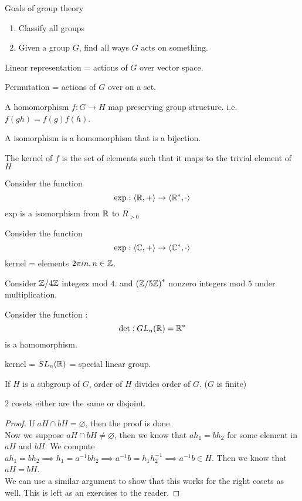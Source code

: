 \begin{remark}
	Goals of group theory
	\begin{enumerate}
		\item Classify all groups
		\item Given a group $G$, find all ways $G$ acts on something.
	\end{enumerate}
\end{remark}
\begin{example}
	Linear representation = actions of $G$ over vector space.

	Permutation = actions of $G$ over on a set.
\end{example}
\begin{definition}
	A homomorphism $f: G \to H$ map preserving group structure. i.e. $f(gh) = f(g)f(h)$.

	A isomorphism is a homomorphism that is a bijection. 

	The kernel of $f$ is the set of elements such that it maps to the trivial element of $H$ 
\end{definition}
\begin{example}
	Consider the function
	\[ \mathrm{exp} : \langle \mathbb R, + \rangle \to \langle \mathbb R^*, \cdot \rangle\]
	exp is a isomorphism from $\mathbb R$ to $R_{> 0}$
\end{example}
\begin{example}
	Consider the function
	\[ \mathrm{exp} : \langle \mathbb C, + \rangle \to \langle \mathbb C^*, \cdot \rangle\]
	kernel = elements $2\pi i n, n \in \mathbb Z$.
\end{example}
\begin{example}
	Consider $\mathbb Z/4 \mathbb Z$ integers mod $4$. and $\left( \mathbb Z/ 5 \mathbb Z \right)^*$ nonzero integers mod $5$ under multiplication.
\end{example}
\begin{example}
	Consider the function :
	\[ \mathrm{det} : GL_n(\mathbb R) = \mathbb R^*\]
	is a homomorphism.

	kernel = $SL_n(\mathbb R)$ = special linear group.
\end{example}
\begin{theorem}
	If $H$ is a subgroup of $G$, order of $H$ divides order of $G$. ($G$ is finite)
\end{theorem}
\begin{lemma}
	2 cosets either are the same or disjoint.
\end{lemma}
\begin{proof}
    If $aH \cap bH = \varnothing$, then the proof is done. \\
    Now we suppose $aH \cap bH \neq \varnothing$, then we know that $ah_1 = bh_2$ for some element in $aH$ and $bH$. We compute $ah_1 = bh_2 \implies h_1 = a^{-1}bh_2 \implies a^{-1}b = h_1h_2^{-1} \implies a^{-1}b \in H$. Then we know that $aH = bH$. \\
    We can use a similar argument to show that this works for the right cosets as well. This is left as an exercises to the reader. 
\end{proof}
